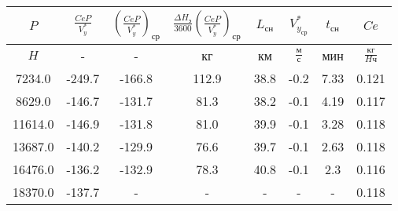 \begin{tabular}{|c|c|c|c|c|c|c|c|}
\hline
$P$ & $\frac{CeP}{V_y^*}$ & $(\frac{CeP}{V_y^*})_{ср}$ & $\frac{\Delta H_э}{3600}(\frac{CeP}{V_y^*})_{ср}$ & $L_{сн}$ & $V_{y_{ср}}^*$ & $t_{сн}$ & $Ce$ \\ 
\hline
$H$ & - & - & кг & км & $\frac{м}{с}$ & мин & $\frac{кг}{H ч}$ \\ 
\hline
7234.0 & -249.7 & -166.8 & 112.9 & 38.8 & -0.2 & 7.33 & 0.121 \\ 
\hline
8629.0 & -146.7 & -131.7 & 81.3 & 38.2 & -0.1 & 4.19 & 0.117 \\ 
\hline
11614.0 & -146.9 & -131.8 & 81.0 & 39.9 & -0.1 & 3.28 & 0.118 \\ 
\hline
13687.0 & -140.2 & -129.9 & 76.6 & 39.7 & -0.1 & 2.63 & 0.118 \\ 
\hline
16476.0 & -136.2 & -132.9 & 78.3 & 40.8 & -0.1 & 2.3 & 0.116 \\ 
\hline
18370.0 & -137.7 & - & - & - & - & - & 0.118 \\ 
\hline
\end{tabular}